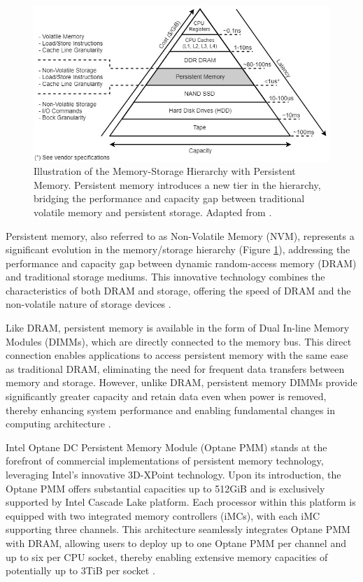 \begin{figure}[ht]
    \centering
    \includegraphics[scale=0.6]{images/pmem_storage_pyramid.jpg}
    \caption[Memory-Storage Hierarchy with Persistent Memory]{Illustration of the Memory-Storage Hierarchy with Persistent Memory. Persistent memory introduces a new tier in the hierarchy, bridging the performance and capacity gap between traditional volatile memory and persistent storage. Adapted from \cite{Introduc86:online}.}
    \label{fig:pmem_storage_pyramid}
\end{figure}

Persistent memory, also referred to as Non-Volatile Memory (NVM), represents a significant evolution in the memory/storage hierarchy (Figure \ref{fig:pmem_storage_pyramid}), addressing the performance and capacity gap between dynamic random-access memory (DRAM) and traditional storage mediums. This innovative technology combines the characteristics of both DRAM and storage, offering the speed of DRAM and the non-volatile nature of storage devices \cite{scargall2020pmem}.

Like DRAM, persistent memory is available in the form of Dual In-line Memory Modules (DIMMs), which are directly connected to the memory bus. This direct connection enables applications to access persistent memory with the same ease as traditional DRAM, eliminating the need for frequent data transfers between memory and storage. However, unlike DRAM, persistent memory DIMMs provide significantly greater capacity and retain data even when power is removed, thereby enhancing system performance and enabling fundamental changes in computing architecture \cite{rudoff2017persistent,scargall2020pmem}.

Intel Optane DC Persistent Memory Module (Optane PMM) stands at the forefront of commercial implementations of persistent memory technology, leveraging Intel's innovative 3D-XPoint technology. Upon its introduction, the Optane PMM offers substantial capacities up to 512GiB and is exclusively supported by Intel Cascade Lake platform. Each processor within this platform is equipped with two integrated memory controllers (iMCs), with each iMC supporting three channels. This architecture seamlessly integrates Optane PMM with DRAM, allowing users to deploy up to one Optane PMM per channel and up to six per CPU socket, thereby enabling extensive memory capacities of potentially up to 3TiB per socket \cite{yang2020empirical,izraelevitz2019basic}.

